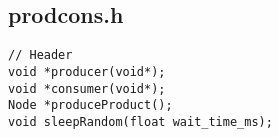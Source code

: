 \subsection{prodcons.h}
\begin{lstlisting}
// Header
void *producer(void*);
void *consumer(void*);
Node *produceProduct();
void sleepRandom(float wait_time_ms);
\end{lstlisting}